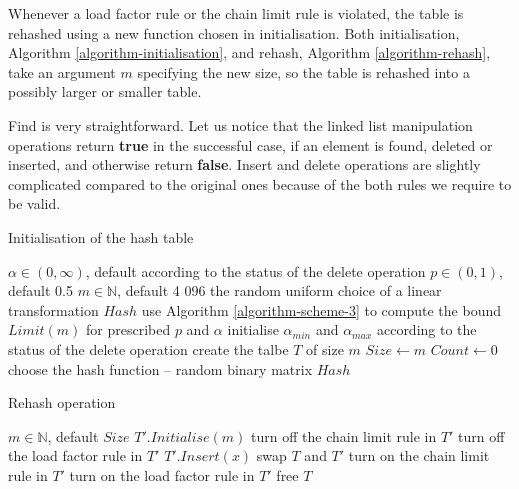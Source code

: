 Whenever a load factor rule or the chain limit rule is violated, the table is rehashed using a new function chosen in initialisation. Both initialisation, Algorithm \ref{algorithm-initialisation}, and rehash, Algorithm \ref{algorithm-rehash}, take an argument $m$ specifying the new size, so the table is rehashed into a possibly larger or smaller table.

Find is very straightforward. Let us notice that the linked list manipulation operations return \textbf{true} in the successful case, if an element is found, deleted or inserted, and otherwise return \textbf{false}. Insert and delete  operations are slightly complicated compared to the original ones because of the both rules we require to be valid.

\begin{algorithm}[p]
\caption{Initialisation of the hash table}
\label{algorithm-initialisation}
\begin{algorithmic}
\REQUIRE $\alpha \in (0, \infty)$, default according to the status of the delete operation
\REQUIRE $p \in (0, 1)$, default 0.5
\REQUIRE $m \in \mathbb{N}$, default 4 096
\STATE
\ENSURE the random uniform choice of a linear transformation $Hash$
\STATE
\STATE use Algorithm \ref{algorithm-scheme-3} to compute the bound $Limit(m)$ for prescribed $p$ and $\alpha$
\STATE initialise $\alpha_{min}$ and $\alpha_{max}$ according to the status of the delete operation
\STATE create the talbe $T$ of size $m$
\STATE $Size \leftarrow m$
\STATE $Count \leftarrow 0$
\STATE choose the hash function -- random binary matrix $Hash$
\end{algorithmic}
\end{algorithm}

\begin{algorithm}[p]
\caption{Rehash operation}
\label{algorithm-rehash}
\begin{algorithmic}
\REQUIRE $m \in \mathbb{N}$, default $Size$ 
\STATE
\REPEAT
	\STATE $T'.Initialise(m)$
	\STATE turn off the chain limit rule in $T'$
	\STATE turn off the load factor rule in $T'$
		\STATE $T'.Insert(x)$
	\ENDFOR
{}
\STATE
\STATE swap $T$ and $T'$
\STATE turn on the chain limit rule in $T'$
\STATE turn on the load factor rule in $T'$
\STATE free $T$
\end{algorithmic}
\end{algorithm}

